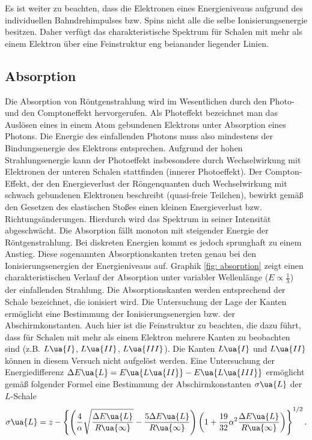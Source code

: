 Es ist weiter zu beachten, dass die Elektronen eines Energieniveaus
aufgrund des individuellen Bahndrehimpulses bzw. Spins nicht alle die selbe Ionisierungsenergie besitzen. Daher verfügt das charakteristische
Spektrum für Schalen mit mehr als einem Elektron über eine Feinstruktur eng beianander liegender Linien.

\subsection{Absorption}
Die Absorption von Röntgenstrahlung wird im Wesentlichen durch den Photo- und den Comptoneffekt hervorgerufen.
Als Photeffekt bezeichnet man das Auslösen eines in einem Atom gebundenen Elektrons unter Absorption eines Photons. Die
Energie des einfallenden Photons muss also mindestens der Bindungsenergie des Elektrons entsprechen.
Aufgrund der hohen Strahlungsenergie kann der Photoeffekt insbesondere durch Wechselwirkung mit Elektronen der unteren
Schalen stattfinden (innerer Photoeffekt). Der Compton-Effekt, der den Energieverlust der Röngenquanten duch Wechselwirkung
mit schwach gebundenen Elektronen beschreibt (quasi-freie Teilchen), bewirkt gemäß den Gesetzen des elastischen Stoßes
einen kleinen Energieverlust bzw. Richtungsänderungen.
Hierdurch wird das Spektrum in seiner Intensität abgeschwächt.
Die Absorption
fällt monoton mit steigender Energie der Röntgenstrahlung. Bei diskreten Energien kommt es jedoch sprunghaft zu einem Anstieg. Diese
sogenannten Absorptionskanten treten genau bei den Ionisierungsenergien der Energieniveaus auf.
Graphik \ref{fig: absorption} zeigt einen charakteristischen
Verlauf der Absorption unter variabler Wellenlänge ($E \propto \frac{1}{\lambda}$) der einfallenden Strahlung.
Die Absorptionskanten werden entsprechend der Schale bezeichnet, die ionisiert wird. Die Untersuchung der Lage der Kanten
ermöglicht eine Bestimmung der Ionisierungsenergien bzw. der Abschirmkonstanten.
Auch hier ist die Feinstruktur zu beachten, die dazu
führt, dass für Schalen mit mehr als einem Elektron mehrere Kanten zu beobachten sind (z.B. $L\ua{I}$, $L\ua{II}$, $L\ua{III}$).
Die Kanten $L\ua{I}$ und $L\ua{II}$ können in diesem Versuch nicht aufgelöst werden. Eine Untersuchung der Energiedifferenz
$\Delta E\ua{L} = E\ua{L\ua{II}} - E\ua{L\ua{III}}$ ermöglicht gemäß folgender Formel eine Bestimmung der Abschirmkonstanten
$\sigma\ua{L}$ der $L$-Schale
\begin{equation}
  \sigma\ua{L} = z - \left\{ \left(\frac{4}{\alpha}\sqrt{\frac{\Delta E\ua{L}}{R\ua{\infty}}} -\frac{5\Delta E\ua{L}}{R\ua{\infty}} \right)
  \left(1 + \frac{19}{32}\alpha^2\frac{\Delta E\ua{L}}{R\ua{\infty}} \right)  \right\}^{1/2}.
  \label{eq: sigma_L}
\end{equation}
